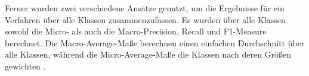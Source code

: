 Ferner wurden zwei verschiedene Ansätze genutzt, um die Ergebnisse für ein Verfahren über alle Klassen zusammenzufassen.
Es wurden über alle Klassen sowohl die Micro- als auch die Macro-Precision, Recall und F1-Measure berechnet.
Die Macro-Average-Maße berechnen einen einfachen Durchschnitt über alle Klassen, während die Micro-Average-Maße die Klassen nach deren Größen gewichten \cite{Manning:2008:IIR:1394399}.

